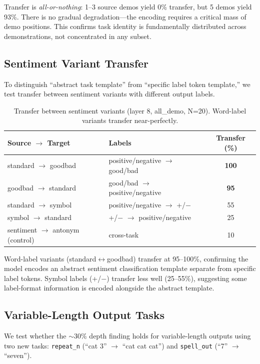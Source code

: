 \documentclass[runningheads]{llncs}
\begin{document}
Transfer is \emph{all-or-nothing}: 1--3 source demos yield 0\% transfer, but 5 demos yield 93\%. There is no gradual degradation---the encoding requires a critical mass of demo positions. This confirms task identity is fundamentally distributed across demonstrations, not concentrated in any subset.

\subsection{Sentiment Variant Transfer}

To distinguish ``abstract task template'' from ``specific label token template,'' we test transfer between sentiment variants with different output labels.

\begin{table}[h]
\centering
\caption{Transfer between sentiment variants (layer 8, all\_demo, N=20). Word-label variants transfer near-perfectly.}
\label{tab:sentiment_variants}
\begin{tabular}{@{}llc@{}}
\toprule
Source $\to$ Target & Labels & Transfer (\%) \\
\midrule
standard $\to$ goodbad & positive/negative $\to$ good/bad & \textbf{100} \\
goodbad $\to$ standard & good/bad $\to$ positive/negative & \textbf{95} \\
standard $\to$ symbol & positive/negative $\to$ +/$-$ & 55 \\
symbol $\to$ standard & +/$-$ $\to$ positive/negative & 25 \\
\midrule
sentiment $\to$ antonym (control) & cross-task & 10 \\
\bottomrule
\end{tabular}
\end{table}

Word-label variants (standard$\leftrightarrow$goodbad) transfer at 95--100\%, confirming the model encodes an abstract sentiment classification template separate from specific label tokens. Symbol labels (+/$-$) transfer less well (25--55\%), suggesting some label-format information is encoded alongside the abstract template.

\subsection{Variable-Length Output Tasks}

We test whether the $\sim$30\% depth finding holds for variable-length outputs using two new tasks: \texttt{repeat\_n} (``cat 3'' $\to$ ``cat cat cat'') and \texttt{spell\_out} (``7'' $\to$ ``seven'').
\end{document}

